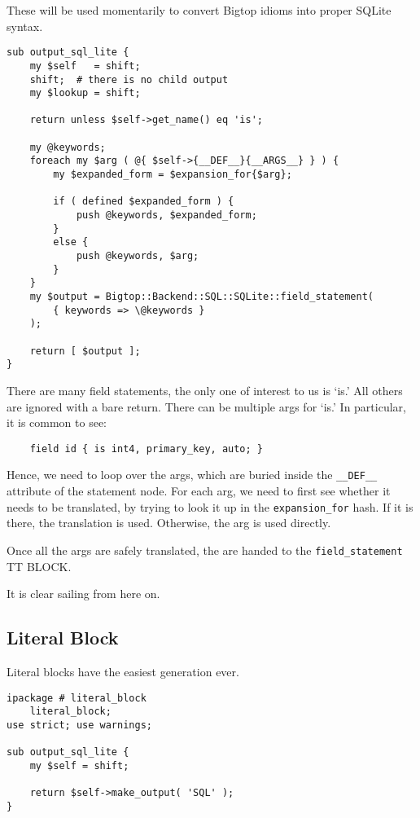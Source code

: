 These will be used momentarily to convert Bigtop idioms into proper SQLite
syntax.

\begin{verbatim}
sub output_sql_lite {
    my $self   = shift;
    shift;  # there is no child output
    my $lookup = shift;

    return unless $self->get_name() eq 'is';

    my @keywords;
    foreach my $arg ( @{ $self->{__DEF__}{__ARGS__} } ) {
        my $expanded_form = $expansion_for{$arg};

        if ( defined $expanded_form ) {
            push @keywords, $expanded_form;
        }
        else {
            push @keywords, $arg;
        }
    }
    my $output = Bigtop::Backend::SQL::SQLite::field_statement(
        { keywords => \@keywords }
    );

    return [ $output ];
}
\end{verbatim}

There are many field statements, the only one of interest to us is `is.'
All others are ignored with a bare return.  There can be multiple args
for `is.'  In particular, it is common to see:

\begin{verbatim}
    field id { is int4, primary_key, auto; }
\end{verbatim}

Hence, we need to loop over the args, which are buried inside the
\verb+__DEF__+ attribute of the statement node.  For each arg, we need
to first see whether it needs to be translated, by trying to look it up
in the \verb+expansion_for+ hash.  If it is there, the translation is used.
Otherwise, the arg is used directly.

Once all the args are safely translated, the are handed to the
\verb+field_statement+ TT BLOCK.

It is clear sailing from here on.

\subsection*{Literal Block}

Literal blocks have the easiest generation ever.

\begin{verbatim}
ipackage # literal_block
    literal_block;
use strict; use warnings;

sub output_sql_lite {
    my $self = shift;

    return $self->make_output( 'SQL' );
}
\end{verbatim}

